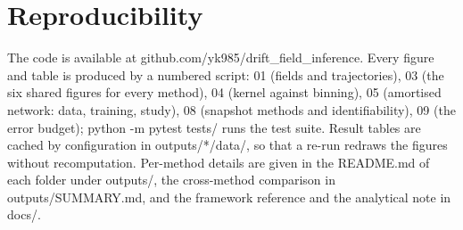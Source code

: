 \documentclass[11pt,a4paper]{article}
\newcommand{\code}[1]{{\ttfamily\small #1}}
\begin{document}
\section{Reproducibility}

The code is available at \code{github.com/yk985/drift\_field\_inference}. Every figure and
table is produced by a numbered script: \code{01} (fields and trajectories),
\code{03} (the six shared figures for every method), \code{04} (kernel against binning),
\code{05}\textendash\code{07} (amortised network: data, training, study), \code{08} (snapshot
methods and identifiability), \code{09} (the error budget); \code{python -m pytest tests/}
runs the test suite. Result tables are cached by configuration in \code{outputs/*/data/}, so
that a re-run redraws the figures without recomputation. Per-method details are given in the
\code{README.md} of each folder under \code{outputs/}, the cross-method comparison in
\code{outputs/SUMMARY.md}, and the framework reference and the analytical note in
\code{docs/}.
\end{document}
